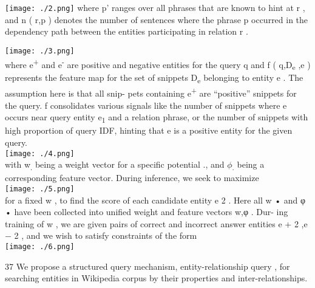 \texttt{[image: ./2.png]}
where
p'
ranges over all phrases that are known to
hint at
r
, and
n
(
r,p
)
denotes the number of sentences where the phrase
p
occurred in the dependency path between the entities participating in relation
r
.

\texttt{[image: ./3.png]}\\
where
e\textsuperscript{+}
and
e\textsuperscript{-}
are positive and negative entities for the query
q
and
f
(
q,D\textsubscript{e}
,e
)
represents the
feature map for the set of snippets
D\textsubscript{e}
belonging
to entity
e
.  The assumption here is that all snip-
pets containing
e\textsuperscript{+}
are “positive” snippets for the
query.
f
consolidates various signals like the number of snippets where
e
occurs near query entity
e\textsubscript{1}
and a relation phrase, or the number of snippets
with high proportion of query IDF, hinting that
e
is a positive entity for the given query.\\

\texttt{[image: ./4.png]}\\

with
w\textsubscript{.}
being a weight vector for a specific potential ., and $ \phi $\textsubscript{.}
being a corresponding feature vector.
During inference, we seek to maximize\\

\texttt{[image: ./5.png]}\\

for a fixed
w
, to find the score of each candidate
entity
e
2
.  Here all
w
•
and
φ
•
have been collected
into unified weight and feature vectors
w,φ
. Dur-
ing training of
w
, we are given pairs of correct and
incorrect answer entities
e
+
2
,e
−
2
,  and we wish to
satisfy constraints of the form \\

\texttt{[image: ./6.png]}


37
We
propose a structured query mechanism,
entity-relationship
query
, for searching entities in Wikipedia corpus by their
properties and inter-relationships.



